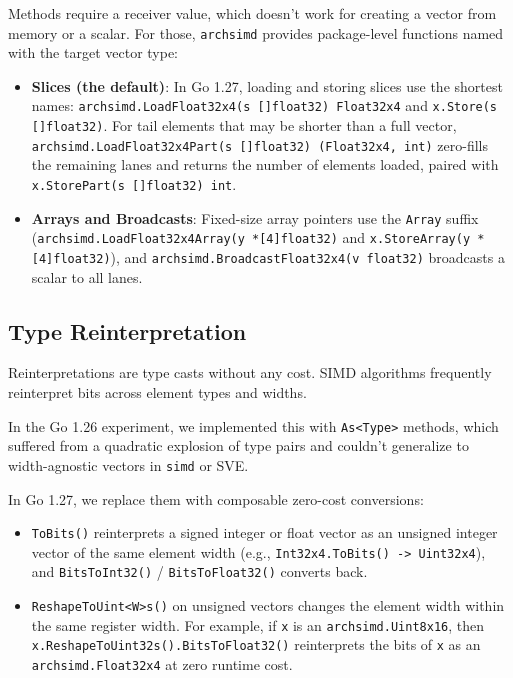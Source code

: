 \documentclass[11pt,a4paper]{article}
\begin{document}
Methods require a receiver value, which doesn't work for creating a vector from memory or a scalar. For those, \texttt{archsimd} provides package-level functions named with the target vector type:

\begin{itemize}
\item \textbf{Slices (the default)}: In Go 1.27, loading and storing slices use the shortest names: \texttt{archsimd.LoadFloat32x4(s []float32) Float32x4} and \texttt{x.Store(s []float32)}. For tail elements that may be shorter than a full vector, \texttt{archsimd.LoadFloat32x4Part(s []float32) (Float32x4, int)} zero-fills the remaining lanes and returns the number of elements loaded, paired with \texttt{x.StorePart(s []float32) int}.
\item \textbf{Arrays and Broadcasts}: Fixed-size array pointers use the \texttt{Array} suffix (\texttt{archsimd.LoadFloat32x4Array(y *[4]float32)} and \texttt{x.StoreArray(y *[4]float32)}), and \texttt{archsimd.BroadcastFloat32x4(v float32)} broadcasts a scalar to all lanes.
\end{itemize}

\subsection{Type Reinterpretation}

Reinterpretations are type casts without any cost. SIMD algorithms frequently reinterpret bits across element types and widths.

In the Go 1.26 experiment, we implemented this with \texttt{As<Type>} methods, which suffered from a quadratic explosion of type pairs and couldn't generalize to width-agnostic vectors in \texttt{simd} or SVE.

In Go 1.27, we replace them with composable zero-cost conversions:

\begin{itemize}
\item \texttt{ToBits()} reinterprets a signed integer or float vector as an unsigned integer vector of the same element width (e.g., \texttt{Int32x4.ToBits() -> Uint32x4}), and \texttt{BitsToInt32()} / \texttt{BitsToFloat32()} converts back.
\item \texttt{ReshapeToUint<W>s()} on unsigned vectors changes the element width within the same register width. For example, if \texttt{x} is an \texttt{archsimd.Uint8x16}, then \texttt{x.ReshapeToUint32s().BitsToFloat32()} reinterprets the bits of \texttt{x} as an \texttt{archsimd.Float32x4} at zero runtime cost.
\end{itemize}
\end{document}
